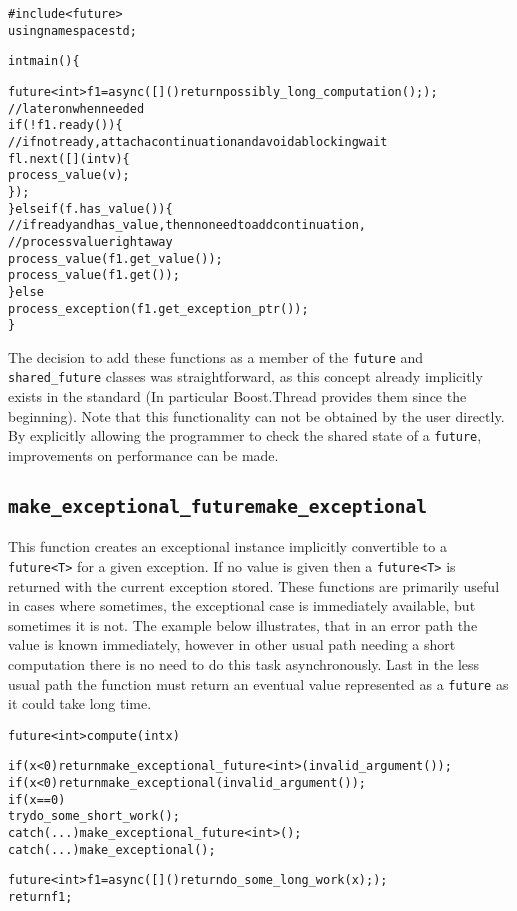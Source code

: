 \documentclass[a4paper,10pt]{article}
\newcommand{\cpp}[1]{\lstinline{#1}}
\newcommand{\suppress}[1]{\colorbox{suppress_color}{#1}}
\newcommand{\update}[1]{\colorbox{update_color}{#1}}
\begin{document}
\begin{alltt}
#include <future> 
using namespace std; 

int main() \{ 
 
  future<int> f1 = async([]() { return possibly_long_computation(); }); 
  // later on when needed 
  if(!f1.ready()) \{ 
    //if not ready, attach a continuation and avoid a blocking wait 
    fl.next([] (int v) \{ 
      process_value(v); 
    \}); 
  \} else if (f.has_value()) \{ 
  //if ready and has_value, then no need to add continuation, 
  // process value right away 
  \suppress{    process_value(f1.get_value()); }
  \update{    process_value(f1.get()); }
  \} else
  \update{    process_exception(f1.get_exception_ptr()); }
\} 
\end{alltt}

The decision to add these functions as a member of the \cpp{future} and \cpp{shared_future} classes was straightforward, as this concept already implicitly exists in the standard (In particular Boost.Thread provides them since the beginning). Note that this functionality can not be obtained by the user directly. By explicitly allowing the programmer to check the shared state of a \cpp{future}, improvements on performance can be made.  

\subsection{\suppress{\cpp{make_exceptional_future}}\update{\cpp{make_exceptional}}}


This function creates an exceptional \update{instance implicitly convertible to a} \cpp{future<T>} for a given exception. If no value is given then a \cpp{future<T>} is returned with the current exception stored. These functions are primarily useful in cases where sometimes, the exceptional case is immediately available, but sometimes it is not. The example below illustrates, that in an error path the value is known immediately, however in other usual path needing a short computation there is no need to do this task asynchronously. Last in the  less usual path the function must return an eventual value represented as a \cpp{future} as it could take long time. 

\begin{alltt}
future<int> compute(int x) { 
 
  \suppress{if (x < 0) return make_exceptional_future<int>(invalid_argument());}
  \update{if (x < 0) return make_exceptional(invalid_argument());}
  if (x == 0) 
    try { do_some_short_work(); } 
    \suppress{catch (...) make_exceptional_future<int>(); }
    \update{catch (...) make_exceptional(); }
 
  future<int> f1 = async([]() { return do_some_long_work(x); }); 
  return f1; 
}
\end{alltt}
\end{document}
